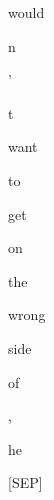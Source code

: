 \documentclass[varwidth=150mm]{standalone}
\begin{document}
\begin{CJK*}{UTF8}{gbsn}
{{{\colorbox{red!1.877471923828125}{\strut would} \colorbox{red!75.74616241455078}{\strut n} \colorbox{red!0.0}{\strut '} \colorbox{red!0.0}{\strut t} \colorbox{red!0.0}{\strut want} \colorbox{red!0.0}{\strut to} \colorbox{red!0.0}{\strut get} \colorbox{red!0.0}{\strut on} \colorbox{red!0.0}{\strut the} \colorbox{red!0.0}{\strut wrong} \colorbox{red!3.2695841789245605}{\strut side} \colorbox{red!0.0}{\strut of} \colorbox{red!1.973032832145691}{\strut ,} \colorbox{red!77.49105834960938}{\strut he} \colorbox{red!1.7194023132324219}{\strut [SEP]}
}}}
\end{CJK*}
\end{document}
